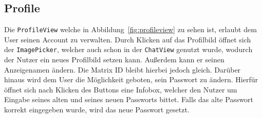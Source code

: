     \subsection{Profile}\label{subsec:profile}
    Die \texttt{ProfileView} welche in Abbildung~\ref{fig:profileview} zu sehen ist, erlaubt dem User seinen Account zu verwalten.
    Durch Klicken auf das Profilbild öffnet sich der \texttt{ImagePicker}, welcher auch schon in der \texttt{ChatView} genutzt wurde, wodurch der Nutzer ein neues Profilbild setzen kann.
    Außerdem kann er seinen Anzeigenamen ändern.
    Die Matrix ID bleibt hierbei jedoch gleich.
    Darüber hinaus wird dem User die Möglichkeit geboten, sein Passwort zu ändern.
    Hierfür öffnet sich nach Klicken des Buttons eine Infobox, welcher den Nutzer um Eingabe seines alten und seines neuen Passworts bittet.
    Falls das alte Passwort korrekt eingegeben wurde, wird das neue Passwort gesetzt.\\

